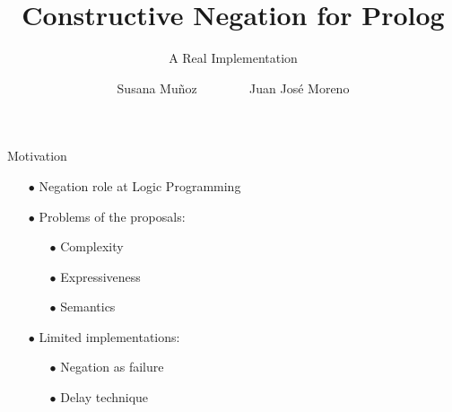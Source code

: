 \documentclass[pdf,slideColor,contemporain]{prosper}
\title{\black Constructive Negation for Prolog}
\subtitle{A Real Implementation}
\author{Susana Mu\~{n}oz ~~~~~~~ Juan Jos\'{e} Moreno}
\begin{document}
\maketitle

\begin{slide}{Motivation}
\vspace{0.3cm}
     \begin{itemize}
        \item[{\blue $\bullet$}] Negation {\blue role} at Logic Programming
        \item[{\blue $\bullet$}] Problems of the {\blue proposals}:
              \begin{itemize}
                \item[$\bullet$] Complexity
                \item[$\bullet$] Expressiveness
                \item[$\bullet$] Semantics
              \end{itemize}
        \item[{\blue $\bullet$}] Limited {\blue implementations}:
              \begin{itemize}
                \item[$\bullet$] Negation as failure
                \item[$\bullet$] Delay technique
              \end{itemize}
     \end{itemize}
\end{slide}
\end{document}
